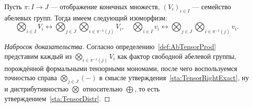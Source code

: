 \documentclass[
	extrafontsizes,
	11pt,
	hyphens,
]{memoir}
\begin{document}
%

\begin{statement}
Пусть \(\pi : I \to J\) --- отображение конечных множеств, \((V_i)_{i \in I}\) --- семейство абелевых групп.
\label{sta:TensorAbAss}
Тогда имеем следующий изоморфизм:
\begin{equation}\label{eq:TensorAssIso}
\textstyle
\bigotimes_{i \in I} V_i
\leftrightarrow
\bigotimes_{j \in J}
	\bigotimes_{i \in \pi^{-1}(j)} V_i,
\quad
\bigotimes_{i \in I} v_i
\leftrightarrow
\bigotimes_{j \in J}
	\bigotimes_{i \in \pi^{-1}(j)} v_i.
\end{equation}
\end{statement}

\begin{proof}[Набросок доказательства]
Согласно определению~\ref{def:AbTensorProd} представим каждый из \(\bigotimes_{i \in \pi^{-1}(j)} V_i\) как фактор свободной абелевой группы, порождённой формальными тензорными мономами, после чего воспользуемся точностью справа \(\bigotimes_{j \in J}(-)\) в смысле утверждения~\ref{sta:TensorRightExact}, ну и дистрибутивностью \(\bigotimes\) относительно \(\bigoplus\), то есть утверждением~\ref{sta:TensorDistr}.
\end{proof}

\end{document}
